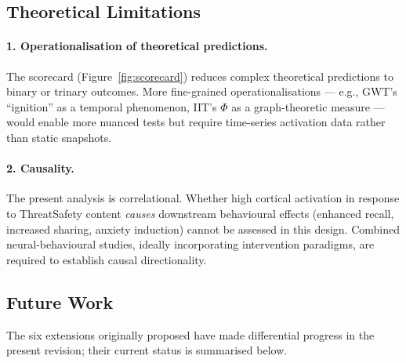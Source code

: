\documentclass[11pt,letterpaper]{article}
\numberwithin{equation}{section}
\begin{document}
\subsection{Theoretical Limitations}

\paragraph{1. Operationalisation of theoretical predictions.} The scorecard (Figure~\ref{fig:scorecard}) reduces complex theoretical predictions to binary or trinary outcomes. More fine-grained operationalisations --- e.g., GWT's ``ignition'' as a temporal phenomenon, IIT's $\Phi$ as a graph-theoretic measure --- would enable more nuanced tests but require time-series activation data rather than static snapshots.

\paragraph{2. Causality.} The present analysis is correlational. Whether high cortical activation in response to ThreatSafety content \textit{causes} downstream behavioural effects (enhanced recall, increased sharing, anxiety induction) cannot be assessed in this design. Combined neural-behavioural studies, ideally incorporating intervention paradigms, are required to establish causal directionality.

\subsection{Future Work}\label{sec:futurework}

The six extensions originally proposed have made differential progress in the present revision; their current status is summarised below.
\end{document}
